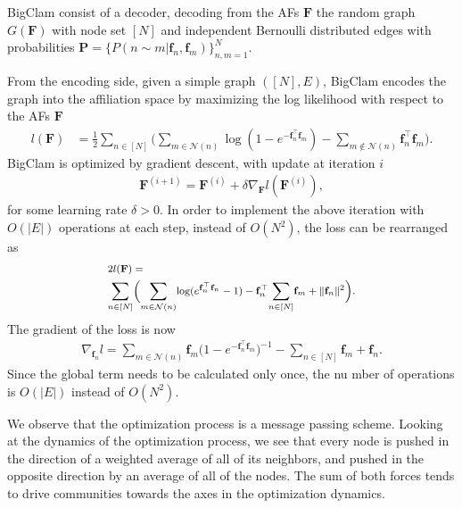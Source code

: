 \documentclass[letterpaper]{article} %
\newcommand{\sumgraph}{\underset{n \in [N]}{\sum}}
\def \sumgraphu {\underset{n\in [N]}{ \sum}}
\def \sumneighbors {\underset {m\in{\mathcal{N}(n)}}{\sum}}
\def \sumstrangers{\underset {m\notin{\mathcal{N}(n)}}{\sum}}
\begin{document}
BigClam consist of a decoder, decoding from the AFs $\mathbf{F}$ the random graph $G(\mathbf{F})$ with node set $[N]$ and independent Bernoulli distributed edges with probabilities $\mathbf{P}=\{P(n\sim m|\mathbf{f}_n, \mathbf{f}_m)\}_{n,m=1}^N$.

From the encoding side, given a simple graph $([N],E)$, BigClam encodes the graph into the affiliation space by maximizing the log likelihood with respect to the AFs $\mathbf{F}$
\begingroup
\footnotesize
\begin{align}
\label{eqn:naiveloss}
     l(\mathbf{F}) &= \frac{1}{2}\sumgraph \Big(\sumneighbors{}{\log(1-e^{-\mathbf{f}_n^{\top } \mathbf{f}_m})} - 
 \sumstrangers{\mathbf{f}_n^{\top } \mathbf{f}_m}\Big).
 \end{align}
 \endgroup
BigClam is optimized by gradient descent, with update at iteration $i$
    \begin{align}
    \label{eqn:vanilla_optimization}
    \mathbf{F}^{(i+1)} = \mathbf{F}^{(i)} + \delta\nabla_{\mathbf{F}}l({\mathbf{F}}^{(i)}),
    \end{align}
for some learning rate $\delta>0$.
In order to implement the above iteration with $O(|E|)$ operations at each step, instead of $O(N^2)$, the loss can be rearranged as
\begingroup
\begin{equation}
\footnotesize
\begin{aligned}
\label{eqn:comp_loss}
   &  2l(\mathbf{F})=\\
   & \sumgraphu \Big(\sumneighbors{\log(e^{\mathbf{f}_n^{\top } \mathbf{f}_n} - 1)}  - \mathbf{f}_n^\top {\sumgraph{\mathbf{f}_m}} + \|\mathbf{f}_n\|^2\Big).
\end{aligned}
\end{equation}
\endgroup
The gradient of the loss is now
\begin{align}
\label{eqn:BCupdate}
    \nabla_{\mathbf{f}_n}l = 
    \sumneighbors{\mathbf{f}_m \big(1-e^{-\mathbf{f}_n^\top  \mathbf{f}_m}
    \big)^{-1}} - \sumgraph{\mathbf{f}_m} + \mathbf{f}_n .
\end{align}
Since the global term needs to be calculated only once, the nu
mber of operations is  $O(|E|)$ instead of $O(N^2)$.  

We observe that the optimization process is a message passing scheme.
Looking at the dynamics of the optimization process, we see that every node is pushed in the direction of a weighted average of all of its neighbors, and pushed in the opposite direction by an average of all of the nodes. The sum of both forces tends to drive communities towards the axes in the optimization dynamics.
\end{document}
